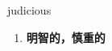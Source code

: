 
\begin{frame}
{\huge judicious}
\begin{center}
\begin{enumerate}\Large
  \item \textbf{明智的，慎重的}
\end{enumerate}
\end{center}
\end{frame}

